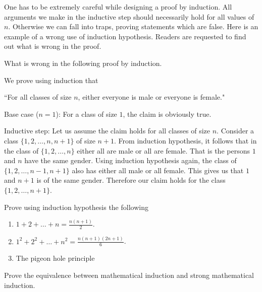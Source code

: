 One has to be extremely careful while designing a proof by induction. All arguments we make in the inductive step should necessarily hold for all values of $n$. Otherwise we can fall into traps, proving statements which are false. Here is an example of a wrong use of induction hypothesis. Readers are requested to find out what is wrong in the proof.
\begin{example}
What is wrong in the following proof by induction. 

We prove using induction that

\centerline{``For all classes of size $n$, either everyone is male or everyone is female."}

Base case ($n=1$): For a class of size $1$, the claim is obviously true.

Inductive step: Let us assume the claim holds for all classes of size $n$. Consider a class $\{1,2,\dots,n,n+1\}$ of size $n+1$.  From induction hypothesis, it follows that in the class of $\{1,2,\dots,n\}$ either all are male or all are female. That is the persons $1$ and $n$ have the same gender. Using induction hypothesis again, the class of $\{1,2,\dots,n-1,n+1\}$ also has either all male or all female. This gives us that $1$ and $n+1$ is of the same gender. Therefore our claim holds for the class $\{1,2,\dots,n+1\}$. 
\end{example}

\begin{exercise}
Prove using induction hypothesis the following
\begin{enumerate}
\item $1+2+\dots+n = \frac{n(n+1)}{2}$.
\item $1^2+2^2+\dots+n^2 = \frac{n(n+1)(2n+1)}{6}$.
\item The pigeon hole principle
\end{enumerate}
\end{exercise}

\begin{exercise}
Prove the equivalence between mathematical induction and strong mathematical induction.
\end{exercise}
